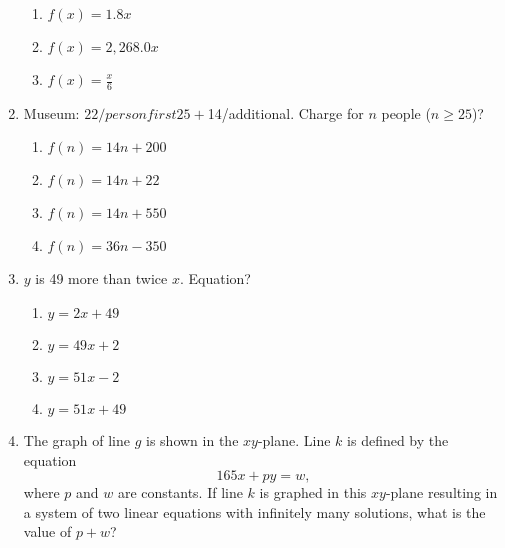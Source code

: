 \documentclass[12pt]{exam}
\begin{document}
\begin{enumerate}
\begin{enumerate}[label=\Alph*)]
        \item $f(x) = 1.8x$
        \item $f(x) = 2,268.0x$
        \item $f(x) = \frac{x}{6}$
    \end{enumerate}
    \item Museum: $22/person first 25 + $14/additional. Charge for $n$ people ($n \geq 25$)?
    \begin{enumerate}[label=\Alph*)]
        \item $f(n) = 14n + 200$
        \item $f(n) = 14n + 22$
        \item $f(n) = 14n + 550$
        \item $f(n) = 36n - 350$
    \end{enumerate}
    \item $y$ is 49 more than twice $x$. Equation?
    \begin{enumerate}[label=\Alph*)]
        \item $y = 2x + 49$
        \item $y = 49x + 2$
        \item $y = 51x - 2$
        \item $y = 51x + 49$
    \end{enumerate}
    \item The graph of line $g$ is shown in the $xy$-plane. Line $k$ is defined by the equation
\[
165x + py = w,
\]
where $p$ and $w$ are constants. If line $k$ is graphed in this $xy$-plane resulting in a system of two linear equations with infinitely many solutions, what is the value of $p + w$?

\begin{center}
\end{center}
\end{enumerate}
\end{document}
